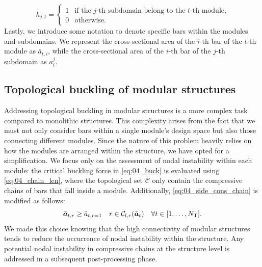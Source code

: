 \begin{equation}
    h_{j,t} =
    \begin{cases}
      1 & \text{if the $j$-th subdomain belong to the $t$-th module,} \\
      0 & \text{otherwise.} 
    \end{cases}
\end{equation}
Lastly, we introduce some notation to denote specific bars within the modules and subdomains. We represent the cross-sectional area of the $i$-th bar of the $t$-th module as $\bar{a}_{t,i}$, while the cross-sectional area of the $i$-th bar of the $j$-th subdomain as $a^j_i$.
\subsection{Topological buckling of modular structures} \label{sec:05_topological}
Addressing topological buckling in modular structures is a more complex task compared to monolithic structures. This complexity arises from the fact that we must not only consider bars within a single module's design space but also those connecting different modules. Since the nature of this problem heavily relies on how the modules are arranged within the structure, we have opted for a simplification.  We focus only on the assessment of nodal instability within each module: the critical buckling force in \eqref{eq:04_buck} is evaluated using \eqref{eq:04_chain_len}, where the topological set $\mathcal{C}$ only contain the compressive chains of bars that fall inside a module. Additionally, \eqref{eq:04_side_cons_chain} is modified as follows:
\begin{equation}\label{eq:05_side_cons_chain_modular}
    \bar{\bm{a}}_{t,r} \geq \bar{a}_{t,r=1} \quad r \in \mathcal{C}_{l,r}(\bar{\bm{a}}_t) \quad \forall t \in [1,\dots,N_\text{T}].
\end{equation}
We made this choice knowing that the high connectivity of modular structures tends to reduce the occurrence of nodal instability within the structure. Any potential nodal instability in compressive chains at the structure level is addressed in a subsequent post-processing phase.

